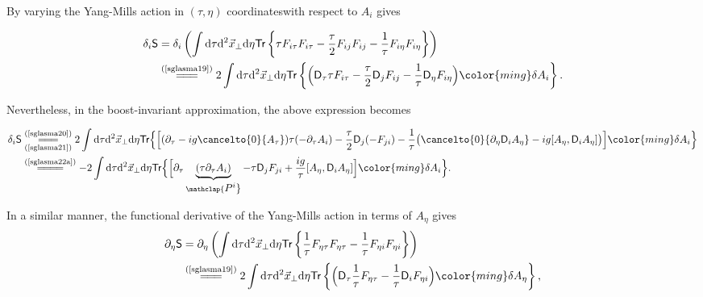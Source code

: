 \begin{note}
By varying the Yang-Mills action in $(\tau,\eta)$ coordinateswith respect to $A_i$ gives
\begin{fullwidth}
\begin{align*}
\delta_i\textsf{S}&=\delta_i\left(\int\mathrm{d}\tau\mathrm{d}^2\vec{x}_\perp\mathrm{d}\eta\textsf{Tr}\left\{\tau F_{i\tau}F_{i\tau}-\frac{\tau}{2}F_{ij}F_{ij}-\frac{1}{\tau}F_{i\eta }F_{i\eta}\right\}\right)\\
&\stackrel{(\text{\cref{sglasma19}})}{=\joinrel=\joinrel=}2\int\mathrm{d}\tau\mathrm{d}^2\vec{x}_\perp\mathrm{d}\eta\textsf{Tr}\left\{\Big(\textsf{D}_\tau\tau F_{i\tau}-\frac{\tau}{2}\textsf{D}_jF_{ij}-\frac{1}{\tau}\textsf{D}_\eta F_{i\eta}\Big){\color{ming}\delta A_i}\right\}.
\end{align*}
\end{fullwidth}
Nevertheless, in the boost-invariant approximation, the above expression becomes
\begin{fullwidth}
\begin{align*}
    \delta_i\textsf{S}&\underset{(\text{\cref{sglasma21}})}{\stackrel{(\text{\cref{sglasma20}})}{=\joinrel=\joinrel=}}2\int\mathrm{d}\tau\mathrm{d}^2\vec{x}_\perp\mathrm{d}\eta\textsf{Tr}\Big\{\Big[(\partial_\tau-ig\cancelto{0}{A_\tau})\tau(-\partial_\tau A_i)-\frac{\tau}{2}\textsf{D}_j(-F_{ji})-\frac{1}{\tau}\big(\cancelto{0}{\partial_\eta\textsf{D}_iA_\eta}-ig[A_\eta,\textsf{D}_iA_\eta]\big)\Big]{\color{ming}\delta A_i}\Big\}\\
    &\stackrel{(\text{\cref{sglasma22a}})}{=\joinrel=\joinrel=\joinrel=}-2\int\mathrm{d}\tau\mathrm{d}^2\vec{x}_\perp\mathrm{d}\eta\textsf{Tr}\Big\{\Big[\partial_\tau\underbrace{(\tau\partial_\tau A_i)}_{\mathclap{\textstyle  P^i}}-\tau\textsf{D}_jF_{ji}+\frac{ig}{\tau}[A_\eta,\textsf{D}_iA_\eta]\Big]{\color{ming}\delta A_i}\Big\}.
\end{align*}
\end{fullwidth}
In a similar manner, the functional derivative of the Yang-Mills action in terms of $A_\eta$ gives
\begin{align*}
    \partial_\eta\textsf{S}&=\partial_\eta\left(\int\mathrm{d}\tau\mathrm{d}^2\vec{x}_\perp\mathrm{d}\eta\textsf{Tr}\left\{\frac{1}{\tau}F_{\eta\tau}F_{\eta\tau}-\frac{1}{\tau}F_{\eta i}F_{\eta i}\right\}\right)\\
    &\stackrel{(\text{\cref{sglasma19}})}{=\joinrel=\joinrel=}2\int\mathrm{d}\tau\mathrm{d}^2\vec{x}_\perp\mathrm{d}\eta\textsf{Tr}\left\{\Big(\textsf{D}_\tau\frac{1}{\tau}F_{\eta\tau}-\frac{1}{\tau}\textsf{D}_iF_{\eta i}\Big){\color{ming}\delta A_\eta}\right\},

\end{align*}
\end{note}
